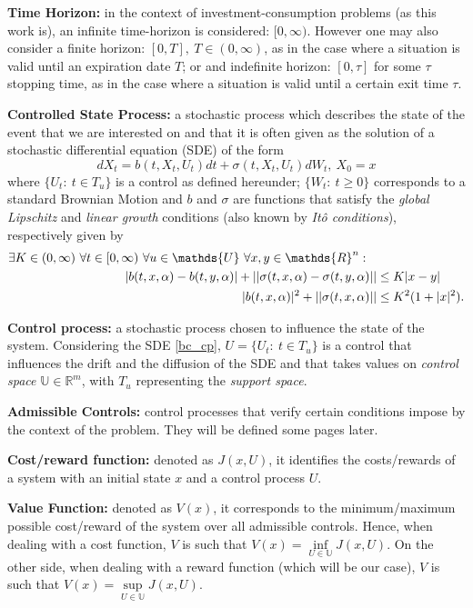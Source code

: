 \textbf{Time Horizon:}
in the context of investment-consumption problems (as this work is), an infinite time-horizon is considered: $[0,\infty)$. However one may also consider a finite horizon: $[0,T], \ T \in(0,\infty)$, as in the case where a situation is valid until an expiration date $T$; or and indefinite horizon: $[0,\tau]$ for some $\tau$ stopping time, as in the case where a situation is valid until a certain exit time $\tau$.


\textbf{Controlled State Process:}  
a stochastic process which describes the state of the event that we are interested on and that it is often given as the solution of a stochastic differential equation (SDE) of the form
\begin{equation}
	d X_t=b(t,X_t,U_t)dt + \sigma (t,X_t,U_t)dW_t, \ X_0=x
	\label{bc_cp}
\end{equation}
where $\{U_t: \ t \in T_u\}$ is a control as defined hereunder; $\{W_t: \ t\geq 0\}$ corresponds to a standard Brownian Motion and $b$ and $\sigma$ are functions that satisfy the \textit{global Lipschitz} and\textit{ linear growth} conditions (also known by \textit{Itô conditions}), respectively given by
\begin{align}
\exists K \in (0,\infty) \  \forall t \in [0,\infty) \ \forall u \in \mathds{U} \ \forall x,y \in\mathds{R}^n: \hspace{3mm} \nonumber &\\
|b(t,x,\alpha)-b(t,y,\alpha)| + || \sigma (t,x,\alpha)- \sigma(t,y,\alpha)|| &\leq K |x-y| \label{bc_cond1} \\
|b(t,x,\alpha)|^2+|| \sigma (t,x,\alpha)|| &\leq K^2 (1+|x|^2).  \label{bc_cond2}
\end{align}


\textbf{Control process:}
a stochastic process chosen to influence the state of the system. Considering the SDE \eqref{bc_cp}, $U=\{U_t: \ t \in T_u\}$ is a control that influences the drift and the diffusion of the SDE and that takes values on \textit{control space} $\mathds{U} \in \mathds{R}^m$, with $T_u$ representing the \textit{support space}.


\textbf{Admissible Controls:}
control processes that verify certain conditions impose by the context of the problem. They will be defined some pages later.

\textbf{Cost/reward function:} 
denoted as $J(x,U)$, it identifies the costs/rewards of a system with an initial state $x$ and a control process $U$.


\textbf{Value Function:}
denoted as $V(x)$, it corresponds to the minimum/maximum possible cost/reward of the system over all admissible controls. Hence, when dealing with a cost function, $V$ is such that $V(x)= \underset{U\in \mathds{U}}{\inf} J(x,U)$. On the other side, when dealing with a reward function (which will be our case), $V$ is such that $V(x)= \underset{U\in \mathds{U}}{\sup} J(x,U)$.


